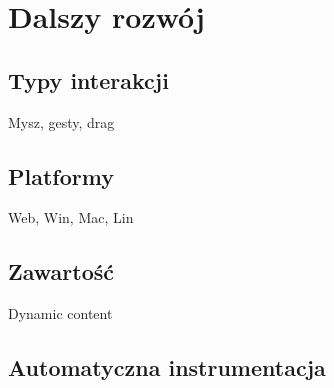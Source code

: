\section{Dalszy rozwój}
\subsection{Typy interakcji}
Mysz, gesty, drag

\subsection{Platformy}
Web, Win, Mac, Lin 

\subsection{Zawartość}
Dynamic content

\subsection{Automatyczna instrumentacja}
